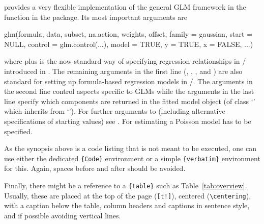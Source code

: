 \documentclass[article]{jss}
\newcommand{\class}[1]{`\code{#1}'}
\newcommand{\fct}[1]{\code{#1()}}
\begin{document}
 provides a very flexible implementation of the general GLM
framework in the function \fct{glm} \citep{Chambers+Hastie:1992} in the
 package. Its most important arguments are
\begin{Code}
  glm(formula, data, subset, na.action, weights, offset,
  family = gaussian, start = NULL, control = glm.control(...),
  model = TRUE, y = TRUE, x = FALSE, ...)
\end{Code}
where  plus  is the now standard way of specifying
regression relationships in / introduced in
\cite{Chambers+Hastie:1992}. The remaining arguments in the first line
(, , , and ) are also
standard  for setting up formula-based regression models in
/. The arguments in the second line control aspects
specific to GLMs while the arguments in the last line specify which components
are returned in the fitted model object (of class \class{glm} which inherits
from \class{lm}). For further arguments to \fct{glm} (including alternative
specifications of starting values) see . For estimating a Poisson
model  has to be specified.

\begin{leftbar}
  As the synopsis above is a code listing that is not meant to be executed,
  one can use either the dedicated \verb|{Code}| environment or a simple
  \verb|{verbatim}| environment for this. Again, spaces before and after should be
  avoided.

  Finally, there might be a reference to a \verb|{table}| such as
  Table~\ref{tab:overview}. Usually, these are placed at the top of the page
  (\verb|[t!]|), centered (\verb|\centering|), with a caption below the table,
  column headers and captions in sentence style, and if possible avoiding vertical
  lines.
\end{leftbar}
\end{document}
